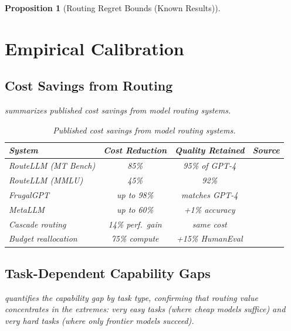\documentclass[11pt, a4paper, logo, copyright]{googledeepmind}
\newtheorem{proposition}{Proposition}[section]
\begin{document}
\begin{proposition}[Routing Regret Bounds (Known Results)]
\section{Empirical Calibration}
\label{sec:calibration}

\subsection{Cost Savings from Routing}

 summarizes published cost savings from model routing systems.

\begin{table}[htbp]
\centering
\caption{Published cost savings from model routing systems.}
\label{tab:routingsavings}
\begin{tabular}{lccl}
\toprule
\textbf{System} & \textbf{Cost Reduction} & \textbf{Quality Retained} & \textbf{Source} \\
\midrule
RouteLLM (MT Bench) & 85\% & 95\% of GPT-4 & \citet{routellm2025} \\
RouteLLM (MMLU) & 45\% & 92\% & \citet{routellm2025} \\
FrugalGPT & up to 98\% & matches GPT-4 & \citet{frugalgpt2023} \\
MetaLLM & up to 60\% & +1\% accuracy & \citet{metallm2024} \\
Cascade routing & 14\% perf.\ gain & same cost & \citet{dekoninck2025cascade} \\
Budget reallocation & 75\% compute & +15\% HumanEval & \citet{hassid2024budget} \\
\bottomrule
\end{tabular}
\end{table}

\subsection{Task-Dependent Capability Gaps}

 quantifies the capability gap by task type, confirming that routing value concentrates in the extremes: very easy tasks (where cheap models suffice) and very hard tasks (where only frontier models succeed).


\end{proposition}
\end{document}
